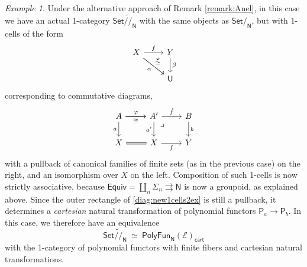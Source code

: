 \documentclass[12pt,reqno]{amsart}
\newcommand{\N}{\ensuremath{\mathbb{N}}}
\newcommand{\EE}{\ensuremath{\mathcal{E}}}
\newcommand{\Set}{\ensuremath{\mathsf{Set}}}
\newcommand{\alg}[1]{\ensuremath{\mathsf{#1}}}
\newcommand{\mono}{\ensuremath{\rightarrowtail}}
\renewcommand{\to}{\ensuremath{\rightarrow}}
\newcommand{\tto}{\ensuremath{\rightrightarrows}}
\newcommand{\T}{\ensuremath{\mathsf{U}}}
\renewcommand{\N}{\ensuremath{\mathsf{N}}}
\newcommand{\pbcorner}{\arrow[dr,phantom,"\lrcorner" very near start, shift right=.5ex]} %
\theoremstyle{remark}
\newtheorem{example}[theorem]{Example}
\theoremstyle{definition}
\begin{document}
\begin{example}
Under the alternative approach of Remark \ref{remark:Anel}, in this case we have an actual 1-category $\Set\widetilde{/\!/}_\N$ with the same objects as $\Set/_\N$, but with 1-cells of the form 
\begin{equation}\label{diag:new1cells3ex}
\begin{tikzcd}
X \ar[r,swap,swap, "{f}"] \ar[rd,swap, "\alpha"] \ar[dr, "{\stackrel{\varphi}{\simeq}}"]&  Y \ar[d, "\beta"] \\
& \T
\end{tikzcd}
\end{equation}
corresponding to commutative diagrams,
\begin{equation}\label{diag:new1cells2ex}
\begin{tikzcd}
 A \ar[r, "{\varphi}"] \ar[r,swap, "{\cong}"] \ar[d,swap, "a"] & A' \ar[d, swap, "a'"]  \ar[r, "{\dot{f}}"]   \pbcorner & B \ar[d, "b"] \\  
 X \ar[r, equals] & X \ar[r,swap, "{f}"] &  Y
 \end{tikzcd}
 \end{equation}
with a pullback of canonical families of finite sets (as in the previous case) on the right, and an isomorphism over $X$ on the left.  Composition of such 1-cells is now strictly associative, because $\mathsf{Equiv} = \coprod_n\Sigma_n\tto \N$ is now a groupoid, as explained above.  Since the outer rectangle of \eqref{diag:new1cells2ex} is still a pullback, it determines a \emph{cartesian} natural transformation of polynomial functors $\alg{P}_a \to \alg{P}_b$. 
In this case, we therefore have an equivalence
\[
\Set\widetilde{/\!/}_\N\ \simeq\ \mathsf{PolyFun}_\N(\EE)_{\mathsf{cart}}
\]
with the 1-category of polynomial functors with finite fibers and cartesian natural transformations.  
%
%
%
%
%
\end{example}
 
%
%
%
\end{document}
